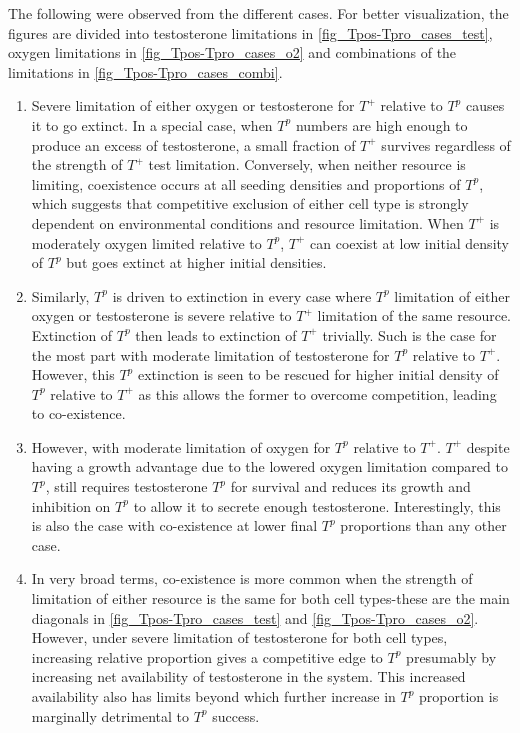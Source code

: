 The following were observed from the different cases. For better visualization, the figures are divided into testosterone limitations in \autoref{fig_Tpos-Tpro_cases_test}, oxygen limitations in \autoref{fig_Tpos-Tpro_cases_o2} and combinations of the limitations in \autoref{fig_Tpos-Tpro_cases_combi}.
\begin{enumerate}
  \item Severe limitation of either oxygen or testosterone for $T^+$ relative to $T^p$ causes it to go extinct. In a special case, when $T^p$ numbers are high enough to produce an excess of testosterone, a small fraction of $T^+$ survives regardless of the strength of $T^+$ test limitation. Conversely, when neither resource is limiting, coexistence occurs at all seeding densities and proportions of $T^p$, which suggests that competitive exclusion of either cell type is strongly dependent on environmental conditions and resource limitation. When $T^+$ is moderately oxygen limited relative to $T^p$, $T^+$ can coexist at low initial density of $T^p$ but goes extinct at higher initial densities.
  \item Similarly, $T^p$ is driven to extinction in every case where $T^p$ limitation of either oxygen or testosterone is severe relative to $T^+$ limitation of the same resource. Extinction of $T^p$ then leads to extinction of $T^+$ trivially. Such is the case for the most part with moderate limitation of testosterone for $T^p$ relative to $T^+$. However, this $T^p$ extinction is seen to be rescued for higher initial density of $T^p$ relative to $T^+$ as this allows the former to overcome competition, leading to co-existence.
  \item However, with moderate limitation of oxygen for $T^p$ relative to $T^+$. $T^+$ despite having a growth advantage due to the lowered oxygen limitation compared to $T^p$, still requires testosterone $T^p$ for survival and reduces its growth and inhibition on $T^p$ to allow it to secrete enough testosterone. Interestingly, this is also the case with co-existence at lower final $T^p$ proportions than any other case.
  \item In very broad terms, co-existence is more common when the strength of limitation of either resource is the same for both cell types-these are the main diagonals in \autoref{fig_Tpos-Tpro_cases_test} and \autoref{fig_Tpos-Tpro_cases_o2}. However, under severe limitation of testosterone for both cell types, increasing relative proportion gives a competitive edge to $T^p$ presumably by increasing net availability of testosterone in the system. This increased availability also has limits beyond which further increase in $T^p$ proportion is marginally detrimental to $T^p$ success.

\end{enumerate}
